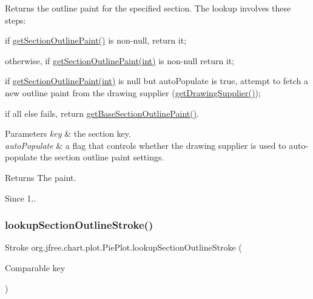 Returns the outline paint for the specified section. The lookup involves these steps\+: 
\begin{DoxyItemize}
\item if \mbox{\hyperlink{classorg_1_1jfree_1_1chart_1_1plot_1_1_pie_plot_a237fbccf0cd23d51f4e62dfcd4a48e1d}{get\+Section\+Outline\+Paint()}} is non-\/{\ttfamily null}, return it; 
\item otherwise, if \mbox{\hyperlink{classorg_1_1jfree_1_1chart_1_1plot_1_1_pie_plot_a07b4cfea40dfe0868d23c9e5264b7fc3}{get\+Section\+Outline\+Paint(int)}} is non-\/{\ttfamily null} return it; 
\item if \mbox{\hyperlink{classorg_1_1jfree_1_1chart_1_1plot_1_1_pie_plot_a07b4cfea40dfe0868d23c9e5264b7fc3}{get\+Section\+Outline\+Paint(int)}} is {\ttfamily null} but {\ttfamily auto\+Populate} is {\ttfamily true}, attempt to fetch a new outline paint from the drawing supplier (\mbox{\hyperlink{classorg_1_1jfree_1_1chart_1_1plot_1_1_plot_a371e21293523674a59d87c9d62ffff15}{get\+Drawing\+Supplier()}}); 
\item if all else fails, return \mbox{\hyperlink{classorg_1_1jfree_1_1chart_1_1plot_1_1_pie_plot_a09734d6fd44506facb9a597034af3eea}{get\+Base\+Section\+Outline\+Paint()}}. 
\end{DoxyItemize}


\begin{DoxyParams}{Parameters}
{\em key} & the section key. \\
\hline
{\em auto\+Populate} & a flag that controls whether the drawing supplier is used to auto-\/populate the section outline paint settings.\\
\hline
\end{DoxyParams}
\begin{DoxyReturn}{Returns}
The paint.
\end{DoxyReturn}
\begin{DoxySince}{Since}
1.. 
\end{DoxySince}
\mbox{\label{classorg_1_1jfree_1_1chart_1_1plot_1_1_pie_plot_a4d772d7522bd8413a7d03d2b70491560}} 
\subsubsection{\texorpdfstring{lookup\+Section\+Outline\+Stroke()}{lookupSectionOutlineStroke()}\hspace{0.1cm}{\footnotesize\ttfamily [1/2]}}
{\footnotesize\ttfamily Stroke org.\+jfree.\+chart.\+plot.\+Pie\+Plot.\+lookup\+Section\+Outline\+Stroke (\begin{DoxyParamCaption}\item[{Comparable}]{key }\end{DoxyParamCaption})\hspace{0.3cm}{\ttfamily [protected]}}


